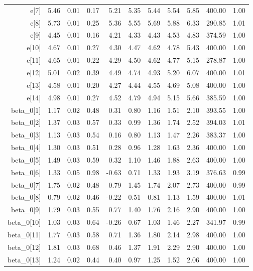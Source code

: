 \begin{longtable}{rrrrrrrrrrr}
  e[7] & 5.46 & 0.01 & 0.17 & 5.21 & 5.35 & 5.44 & 5.54 & 5.85 & 400.00 & 1.00 \\ 
  e[8] & 5.73 & 0.01 & 0.25 & 5.36 & 5.55 & 5.69 & 5.88 & 6.33 & 290.85 & 1.01 \\ 
  e[9] & 4.45 & 0.01 & 0.16 & 4.21 & 4.33 & 4.43 & 4.53 & 4.83 & 374.59 & 1.00 \\ 
  e[10] & 4.67 & 0.01 & 0.27 & 4.30 & 4.47 & 4.62 & 4.78 & 5.43 & 400.00 & 1.00 \\ 
  e[11] & 4.65 & 0.01 & 0.22 & 4.29 & 4.50 & 4.62 & 4.77 & 5.15 & 278.87 & 1.00 \\ 
  e[12] & 5.01 & 0.02 & 0.39 & 4.49 & 4.74 & 4.93 & 5.20 & 6.07 & 400.00 & 1.01 \\ 
  e[13] & 4.58 & 0.01 & 0.20 & 4.27 & 4.44 & 4.55 & 4.69 & 5.08 & 400.00 & 1.00 \\ 
  e[14] & 4.98 & 0.01 & 0.27 & 4.52 & 4.79 & 4.94 & 5.15 & 5.66 & 385.59 & 1.00 \\ 
  beta_0[1] & 1.17 & 0.02 & 0.48 & 0.31 & 0.80 & 1.16 & 1.51 & 2.10 & 393.55 & 1.00 \\ 
  beta_0[2] & 1.37 & 0.03 & 0.57 & 0.33 & 0.99 & 1.36 & 1.74 & 2.52 & 394.03 & 1.01 \\ 
  beta_0[3] & 1.13 & 0.03 & 0.54 & 0.16 & 0.80 & 1.13 & 1.47 & 2.26 & 383.37 & 1.00 \\ 
  beta_0[4] & 1.30 & 0.03 & 0.51 & 0.28 & 0.96 & 1.28 & 1.63 & 2.36 & 400.00 & 1.00 \\ 
  beta_0[5] & 1.49 & 0.03 & 0.59 & 0.32 & 1.10 & 1.46 & 1.88 & 2.63 & 400.00 & 1.00 \\ 
  beta_0[6] & 1.33 & 0.05 & 0.98 & -0.63 & 0.71 & 1.33 & 1.93 & 3.19 & 376.63 & 0.99 \\ 
  beta_0[7] & 1.75 & 0.02 & 0.48 & 0.79 & 1.45 & 1.74 & 2.07 & 2.73 & 400.00 & 0.99 \\ 
  beta_0[8] & 0.79 & 0.02 & 0.46 & -0.22 & 0.51 & 0.81 & 1.13 & 1.59 & 400.00 & 1.01 \\ 
  beta_0[9] & 1.79 & 0.03 & 0.55 & 0.77 & 1.40 & 1.76 & 2.16 & 2.90 & 400.00 & 1.00 \\ 
  beta_0[10] & 1.03 & 0.03 & 0.64 & -0.26 & 0.67 & 1.03 & 1.46 & 2.27 & 341.97 & 0.99 \\ 
  beta_0[11] & 1.77 & 0.03 & 0.58 & 0.71 & 1.36 & 1.80 & 2.14 & 2.98 & 400.00 & 1.00 \\ 
  beta_0[12] & 1.81 & 0.03 & 0.68 & 0.46 & 1.37 & 1.91 & 2.29 & 2.90 & 400.00 & 1.00 \\ 
  beta_0[13] & 1.24 & 0.02 & 0.44 & 0.40 & 0.97 & 1.25 & 1.52 & 2.06 & 400.00 & 1.00 \\ 

\end{longtable}
